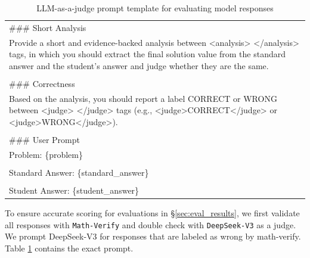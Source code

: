 \documentclass{article} %
\begin{document}
\begin{table}[th!]
\begin{tabular}{p{}}
\#\#\# Short Analysis \\
Provide a short and evidence-backed analysis between <analysis> </analysis> tags, in which you should extract the final solution value from the standard answer and the student's answer and judge whether they are the same. \\
\\
\#\#\# Correctness \\
Based on the analysis, you should report a label CORRECT or WRONG between <judge> </judge> tags (e.g., <judge>CORRECT</judge> or <judge>WRONG</judge>). \\
\\
\#\#\# User Prompt \\
Problem: \{problem\} \\
\\
Standard Answer: \{standard\_answer\} \\
\\
Student Answer: \{student\_answer\} \\
    \bottomrule
    \end{tabular}
    \caption{LLM-as-a-judge prompt template for evaluating model responses}
    \label{tab:llm_judge_prompt}
\end{table}

To ensure accurate scoring for evaluations in \S \ref{sec:eval_results}, we first validate all responses with \texttt{Math-Verify} \citep{Math-Verify} and double check with \texttt{DeepSeek-V3} as a judge. We prompt DeepSeek-V3 for responses that are labeled as wrong by math-verify. Table \ref{tab:llm_judge_prompt} contains the exact prompt.
\end{document}
